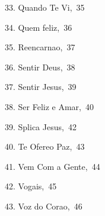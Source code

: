 \item\ 33. Quando Te Vi\hbox {, 35}
\item\ 34. Quem  feliz\hbox {, 36}
\item\ 35. Reencarnao\hbox {, 37}
\item\ 36. Sentir Deus\hbox {, 38}
\item\ 37. Sentir Jesus\hbox {, 39}
\item\ 38. Ser Feliz e Amar\hbox {, 40}
\item\ 39. Splica  Jesus\hbox {, 42}
\item\ 40. Te Ofereo Paz\hbox {, 43}
\item\ 41. Vem Com a Gente\hbox {, 44}
\item\ 42. Vogais\hbox {, 45}
\item\ 43. Voz do Corao\hbox {, 46}
